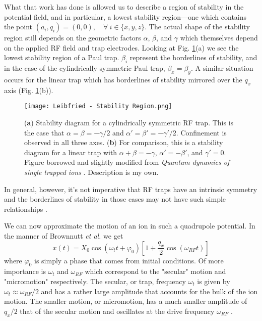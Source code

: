 What that work has done is allowed us to describe a region of stability in the potential field, and in particular, a lowest stability region---one which contains the point $(a_i, q_i) = (0,0), \quad \forall \: i \in \{x, y, z\}$. The actual shape of the stability region still depends on the geometric factors $\alpha$, $\beta$, and $\gamma$ which themselves depend on the applied RF field and trap electrodes. Looking at Fig. \ref{fig:Stability Region}(a) we see the lowest stability region of a Paul trap. $\beta_i$ represent the borderlines of stability, and in the case of the cylindrically symmetric Paul trap, $\beta_x = \beta_y$. A similar situation occurs for the linear trap which has borderlines of stability mirrored over the $q_x$ axis (Fig. \ref{fig:Stability Region}(b)).
\begin{figure}[h]
    \texttt{[image: Leibfried - Stability Region.png]}
    \caption{(\textbf{a}) Stability diagram for a cylindrically symmetric RF trap. This is the case that $\alpha=\beta = -\gamma/2$ and $\alpha'=\beta' = -\gamma'/2$. Confinement is observed in all three axes. (\textbf{b}) For comparison, this is a stability diagram for a linear trap with $\alpha+\beta = -\gamma$, $\alpha' = -\beta'$, and $\gamma'=0$. Figure borrowed and slightly modified from \textit{Quantum dynamics of single trapped ions} \cite{Leibfried}. Description is my own.}
    \label{fig:Stability Region}
\end{figure}
In general, however, it's not imperative that RF traps have an intrinsic symmetry and the borderlines of stability in those cases may not have such simple relationships \cite{Leibfried}.

We can now approximate the motion of an ion in such a quadrupole potential. In the manner of Brownnutt \textit{et al.} we get
\begin{equation}
    x(t) = X_0 \cos(\omega_t t + \varphi_0) \left[ 1 + \frac{q_x}{2} \cos(\omega_{RF} t) \right]
\end{equation}
where $\varphi_0$ is simply a phase that comes from initial conditions. Of more importance is $\omega_t$ and $\omega_{RF}$ which correspond to the "secular" motion and "micromotion" respectively. The secular, or trap, frequency $\omega_t$ is given by $\omega_t \approx \omega_{RF}/2$ and has a rather large amplitude that accounts for the bulk of the ion motion. The smaller motion, or micromotion, has a much smaller amplitude of $q_x/2$ that of the secular motion and oscillates at the drive frequency $\omega_{RF}$ \cite{Brownnutt}.

